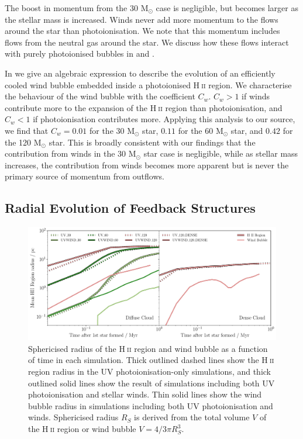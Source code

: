 \documentclass[a4paper,fleqn,usenatbib]{mnras}
\newcommand{\Msolar}{M$_{\odot}$\xspace}
\newcommand{\HII}{H$~$\textsc{ii}\xspace}
\begin{document}
The boost in momentum from the 30 \Msolar case is negligible, but becomes larger as the stellar mass is increased. Winds never add more momentum to the flows around the star than photoionisation. We note that this momentum includes flows from the neutral gas around the star. We discuss how these flows interact with purely photoionised bubbles in \cite{Geen2015b} and \cite{Geen2016}.

In \cite{Geen2019} we give an algebraic expression to describe the evolution of an efficiently cooled wind bubble embedded inside a photoionised \HII region. We characterise the behaviour of the wind bubble with the coefficient $C_w$. $C_w > 1$ if winds contribute more to the expansion of the \HII region than photoionisation, and $C_w < 1$ if photoionisation contributes more. Applying this analysis to our source, we find that $C_w = 0.01$ for the 30 \Msolar star, $0.11$ for the 60 \Msolar star, and $0.42$ for the 120 \Msolar star. This is broadly consistent with our findings that the contribution from winds in the 30 \Msolar star case is negligible, while as stellar mass increases, the contribution from winds becomes more apparent but is never the primary source of momentum from outflows.

\subsection{Radial Evolution of Feedback Structures}
\label{results:radius}

\begin{figure}
	\includegraphics[width=1.9\columnwidth]{../plots/radius_both.pdf}
	\caption{Sphericised radius of the \HII region and wind bubble as a function of time in each simulation. Thick outlined dashed lines show the \HII region radius in the UV photoionisation-only simulations, and thick outlined solid lines show the result of simulations including both UV photoionisation and stellar winds. Thin solid lines show the wind bubble radius in simulations including both UV photoionisation and winds. Sphericised radius $R_S$ is derived from the total volume $V$ of the \HII region or wind bubble $V = 4/3 \pi R_S^3$.}
	\label{fig:radius}
\end{figure}
\end{document}
